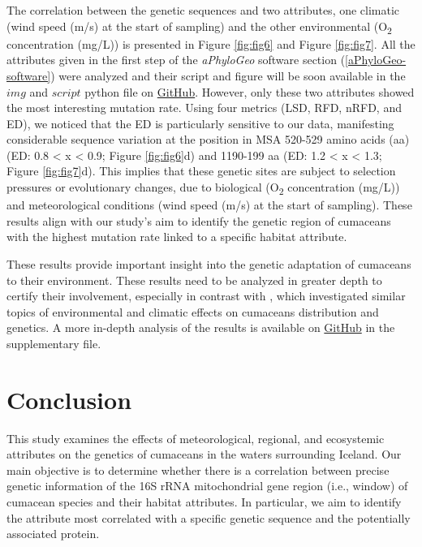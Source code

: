 The correlation between the genetic sequences and two attributes, one climatic (wind speed (m/s) at the start of sampling) and the other environmental (O\textsubscript{2} concentration (mg/L)) is presented in Figure \ref{fig:fig6} and Figure \ref{fig:fig7}. All the attributes given in the first step of the \textit{aPhyloGeo} software section (\autoref{aPhyloGeo-software}) were analyzed and their script and figure will be soon available in the $img$ and $script$ python file on \href{https://github.com/tahiri-lab/Cumacea_aPhyloGeo}{GitHub}. However, only these two attributes showed the most interesting mutation rate. Using four metrics (LSD, RFD, nRFD, and ED), we noticed that the ED is particularly sensitive to our data, manifesting considerable sequence variation at the position in MSA 520-529 amino acids (aa) (ED: 0.8 < x < 0.9; Figure \ref{fig:fig6}d) and 1190-199 aa (ED: 1.2 < x < 1.3; Figure \ref{fig:fig7}d). This implies that these genetic sites are subject to selection pressures or evolutionary changes, due to biological (O\textsubscript{2} concentration (mg/L)) and meteorological conditions (wind speed (m/s) at the start of sampling). These results align with our study's aim to identify the genetic region of cumaceans with the highest mutation rate linked to a specific habitat attribute.

These results provide important insight into the genetic adaptation of cumaceans to their environment. These results need to be analyzed in greater depth to certify their involvement, especially in contrast with \citep{uhlir_adding_2021}, which investigated similar topics of environmental and climatic effects on cumaceans distribution and genetics. A more in-depth analysis of the results is available on \href{https://github.com/tahiri-lab/Cumacea_aPhyloGeo}{GitHub} in the supplementary file.

\section{Conclusion}\label{conclusion}
This study examines the effects of meteorological, regional, and ecosystemic attributes on the genetics of cumaceans in the waters surrounding Iceland. Our main objective is to determine whether there is a  correlation between precise genetic information of the 16S rRNA mitochondrial gene region (i.e., window) of cumacean species and their habitat attributes. In particular, we aim to identify the attribute most correlated with a specific genetic sequence and the potentially associated protein.

